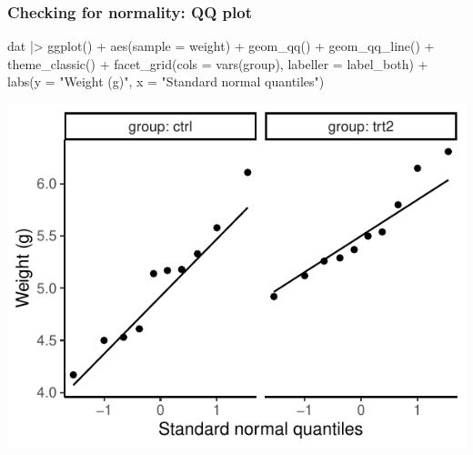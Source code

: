 \documentclass[a4paper]{article}\usepackage[]{graphicx}\usepackage[]{xcolor}
\makeatletter
\def\maxwidth{ %
  \ifdim\Gin@nat@width>\linewidth
    \linewidth
  \else
    \Gin@nat@width
  \fi
}
\makeatother
\begin{document}
\subsubsection{Checking for normality: QQ plot}
\begin{Schunk}
\begin{Sinput}
dat |> 
  ggplot() + aes(sample = weight) + 
  geom_qq() + geom_qq_line() + 
  theme_classic() +
  facet_grid(cols = vars(group), labeller = label_both) + 
  labs(y = "Weight (g)", x = "Standard normal quantiles")
\end{Sinput}


{\centering \includegraphics[width=\maxwidth]{figure/listings-unnamed-chunk-139-1} 

}

\end{Schunk}
\end{document}
